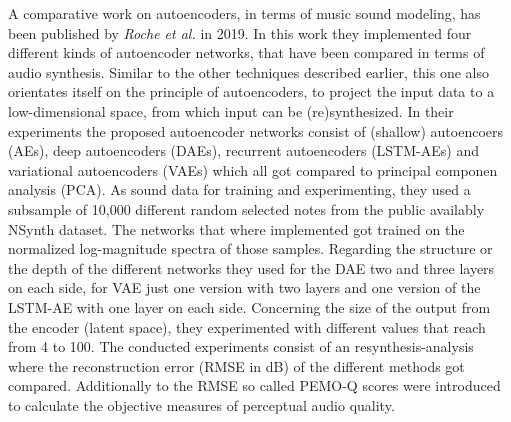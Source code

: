 A comparative work on autoencoders, in terms of music sound modeling, has been published by \textit{Roche et al.} in 2019. \cite{roche2019autoencoders} In this work they implemented four different kinds of autoencoder networks, that have been compared in terms of audio synthesis. Similar to the other techniques described earlier, this one also orientates itself on the principle of autoencoders, to project the input data to a low-dimensional space, from which input can be (re)synthesized. In their experiments the proposed autoencoder networks consist of (shallow) autoencoers (AEs), deep autoencoders (DAEs), recurrent autoencoders (LSTM-AEs) and variational autoencoders (VAEs) which all got compared to principal componen analysis (PCA). As sound data for training and experimenting, they used a subsample of 10,000 different random selected notes from the public availably NSynth dataset. The networks that where implemented got trained on the normalized log-magnitude spectra of those samples. Regarding the structure or the depth of the different networks they used for the DAE two and three layers on each side, for VAE just one version with two layers and one version of the LSTM-AE with one layer on each side. Concerning the size of the output from the encoder (latent space), they experimented with different values that reach from 4 to 100. The conducted experiments consist of an resynthesis-analysis where the reconstruction error (RMSE in dB) of the different methods got compared. Additionally to the RMSE so called PEMO-Q scores were introduced to calculate the objective measures of perceptual audio quality.\\
